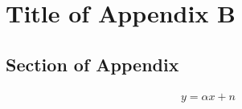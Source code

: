 
\chapter{Title of Appendix B}
\label{appendix_1}
\graphicspath{{100_Appendices/}}
\section{Section of Appendix}
\lipsum[4-5]

\begin{align}
y=\alpha x+n
\end{align}
